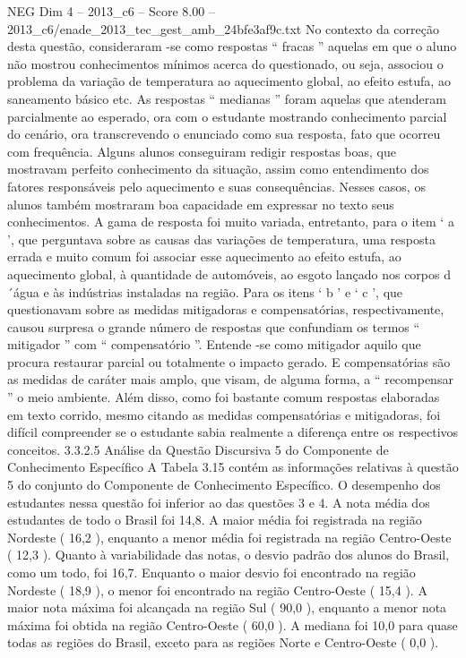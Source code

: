 \begin{textsample}{NEG Dim 4 – 2013\_c6 – Score 8.00 – 2013\_c6/enade\_2013\_tec\_gest\_amb\_24bfe3af9c.txt}
No contexto da correção desta questão, consideraram -se como respostas “ fracas ” aquelas em que o aluno não mostrou conhecimentos mínimos acerca do questionado, ou seja, associou o problema da variação de temperatura ao aquecimento global, ao efeito estufa, ao saneamento básico etc.
As respostas “ medianas ” foram aquelas que atenderam parcialmente ao esperado, ora com o estudante mostrando conhecimento parcial do cenário, ora transcrevendo o enunciado como sua resposta, fato que ocorreu com frequência.
Alguns alunos conseguiram redigir respostas boas, que mostravam perfeito conhecimento da situação, assim como entendimento dos fatores responsáveis pelo aquecimento e suas consequências.
Nesses casos, os alunos também mostraram boa capacidade em expressar no texto seus conhecimentos.
A gama de resposta foi muito variada, entretanto, para o item ‘ a ’, que perguntava sobre as causas das variações de temperatura, uma resposta errada e muito comum foi associar esse aquecimento ao efeito estufa, ao aquecimento global, à quantidade de automóveis, ao esgoto lançado nos corpos d´água e às indústrias instaladas na região.
Para os itens ‘ b ’ e ‘ c ’, que questionavam sobre as medidas mitigadoras e compensatórias, respectivamente, causou surpresa o grande número de respostas que confundiam os termos “ mitigador ” com “ compensatório ”.
Entende -se como mitigador aquilo que procura restaurar parcial ou totalmente o impacto gerado.
E compensatórias são as medidas de caráter mais amplo, que visam, de alguma forma, a “ recompensar ” o meio ambiente.
Além disso, como foi bastante comum respostas elaboradas em texto corrido, mesmo citando as medidas compensatórias e mitigadoras, foi difícil compreender se o estudante sabia realmente a diferença entre os respectivos conceitos. 3.3.2.5 Análise da Questão Discursiva 5 do Componente de Conhecimento Específico A Tabela 3.15 contém as informações relativas à questão 5 do conjunto do Componente de Conhecimento Específico.
O desempenho dos estudantes nessa questão foi inferior ao das questões 3 e 4.
A nota média dos estudantes de todo o Brasil foi 14,8.
A maior média foi registrada na região Nordeste ( 16,2 ), enquanto a menor média foi registrada na região Centro-Oeste ( 12,3 ).
Quanto à variabilidade das notas, o desvio padrão dos alunos do Brasil, como um todo, foi 16,7.
Enquanto o maior desvio foi encontrado na região Nordeste ( 18,9 ), o menor foi encontrado na região Centro-Oeste ( 15,4 ).
A maior nota máxima foi alcançada na região Sul ( 90,0 ), enquanto a menor nota máxima foi obtida na região Centro-Oeste ( 60,0 ).
A mediana foi 10,0 para quase todas as regiões do Brasil, exceto para as regiões Norte e Centro-Oeste ( 0,0 ).

\end{textsample}
